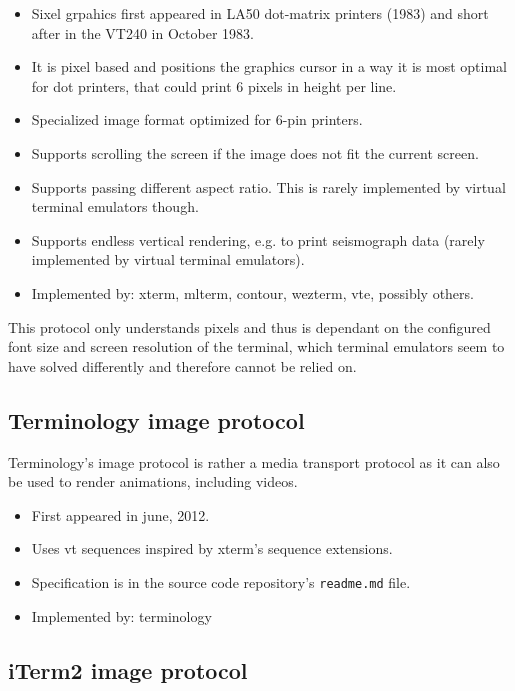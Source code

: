 \documentclass[a4paper]{article}
\begin{document}
\begin{itemize}
    \item Sixel grpahics first appeared in LA50 dot-matrix printers (1983) and short after in the VT240 in October 1983.
    \item It is pixel based and positions the graphics cursor in a way it is most optimal for dot printers,
        that could print 6 pixels in height per line.
    \item Specialized image format optimized for 6-pin printers.
    \item Supports scrolling the screen if the image does not fit the current screen.
    \item Supports passing different aspect ratio. This is rarely implemented by virtual terminal emulators though.
    \item Supports endless vertical rendering, e.g. to print seismograph data (rarely implemented by virtual terminal emulators).
    \item Implemented by: xterm, mlterm, contour, wezterm, vte, possibly others.
\end{itemize}

This protocol only understands pixels and thus is dependant on the
configured font size and screen resolution of the terminal, which
terminal emulators seem to have solved differently and therefore cannot
be relied on.

\subsection{Terminology image protocol}

Terminology's image protocol is rather a media transport protocol as it
can also be used to render animations, including videos.

\begin{itemize}
    \item First appeared in june, 2012.
    \item Uses vt sequences inspired by xterm's sequence extensions.
    \item Specification is in the source code repository's \texttt{readme.md} file.
    \item Implemented by: terminology
\end{itemize}

\subsection{iTerm2 image protocol}
\end{document}
